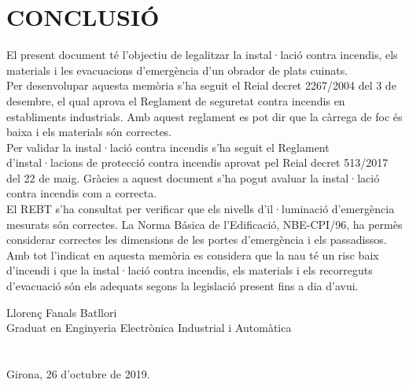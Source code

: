\chapter{\uppercase{Conclusió}}
El present document té l'objectiu de legalitzar la instal·lació contra incendis, els materials i les evacuacions d'emergència d'un obrador de plats cuinats.\\
\newline
Per desenvolupar aquesta memòria s'ha seguit el Reial decret 2267/2004 del 3 de desembre, el qual aprova el Reglament de seguretat contra incendis en establiments industrials. Amb aquest reglament es pot dir que la càrrega de foc és baixa i els materials són correctes.\\
\newline Per validar la instal·lació contra incendis s'ha seguit el Reglament d'instal·lacions de protecció contra incendis aprovat pel Reial decret 513/2017 del 22 de maig. Gràcies a aquest document s'ha pogut avaluar la instal·lació contra incendis com a correcta.\\
\newline El REBT s'ha consultat per verificar que els nivells d'il·luminació d'emergència mesurats són correctes. La Norma Básica de l'Edificació, NBE-CPI/96, ha permès considerar correctes les dimensions de les portes d'emergència i els passadissos.\\
%
\newline Amb tot l'indicat en aquesta memòria es considera que la nau té un risc baix d'incendi i que la instal·lació contra incendis, els materials i els recorreguts d'evacuació són els adequats segons la legislació present fins a dia d'avui. 

\vspace*{\fill}
\noindent Llorenç Fanals Batllori\\
Graduat en Enginyeria Electrònica Industrial i Automàtica\\
\\
\\
Girona, 26 d'octubre de 2019.

\clearpage
